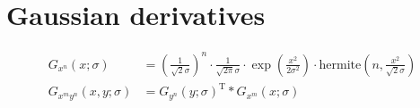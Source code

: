 \documentclass[thesis.tex]{subfiles}
\begin{document}
\chapter{Gaussian derivatives}
%
\begin{align*}
	G_{x^n}(x;\sigma) &= \left(\frac{1}{\sqrt{2}\sigma}\right)^n \cdot
						 \frac{1}{\sqrt{2\pi}\sigma} \cdot
						 \exp \left( \frac{x^2}{2\sigma^2} \right) \cdot
						 \text{hermite} \left(n,\frac{x^2}{\sqrt{2}\sigma} \right) \\
	G_{x^m y^n}(x,y;\sigma) &=
						G_{y^n}(y;\sigma)^\text{T} \ast G_{x^m}(x;\sigma)
\end{align*}
\subbibliography
\end{document}
